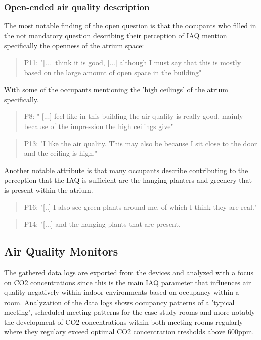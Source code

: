 \subsubsection{Open-ended air quality description}
The most notable finding of the open question is that the occupants who filled in the not mandatory question describing their perception of IAQ mention specifically the openness of the atrium space:

\begin{quote}
P11: "[...] think it is good, [...] although I must say that this is mostly based on the large amount of open space in the building"
\end{quote}

With some of the occupants mentioning the 'high ceilings' of the atrium specifically.

\begin{quote}
P8: " [...] feel like in this building the air quality is really good, mainly because of the impression the high ceilings give"
\end{quote}

\begin{quote}
P13: "I like the air quality. This may also be because I sit close to the door and the ceiling is high."
\end{quote}

Another notable attribute is that many occupants describe contributing to the perception that the IAQ is sufficient are the hanging planters and greenery that is present within the atrium.

\begin{quote}
P16: "[..] I also see green plants around me, of which I think they are real."
\end{quote}

\begin{quote}
P14: "[...] and the hanging plants that are present.
\end{quote}



\subsection{Air Quality Monitors}
\label{sec:monitor_analysis}

The gathered data logs are exported from the devices and analyzed with a focus on CO2 concentrations since this is the main IAQ parameter that influences air quality negatively within indoor environments based on occupancy within a room. Analyzation of the data logs shows occupancy patterns of a 'typical meeting', scheduled meeting patterns for the case study rooms and more notably the development of CO2 concentrations within both meeting rooms regularly where they regulary exceed optimal CO2 concentration tresholds above 600ppm.


